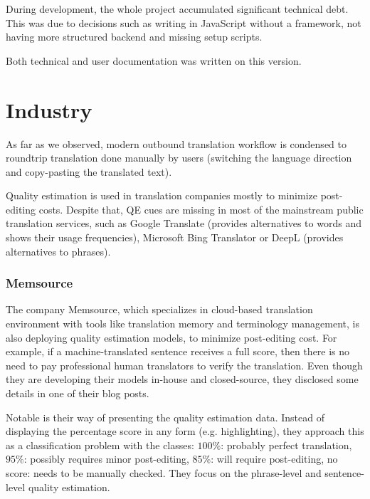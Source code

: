 During development, the whole project accumulated significant technical debt. This was due to decisions such as writing in JavaScript without a framework, not having more structured backend and missing setup scripts.

Both technical and user documentation was written on this version.

\newpage

\section{Industry} \label{sec:related_industry}

As far as we observed, modern outbound translation workflow is condensed to roundtrip translation done manually by users (switching the language direction and copy-pasting the translated text).

Quality estimation is used in translation companies mostly to minimize post-editing costs. Despite that, QE cues are missing in most of the mainstream public translation services, such as Google Translate (provides alternatives to words and shows their usage frequencies), Microsoft Bing Translator or DeepL (provides alternatives to phrases).

\subsubsection{Memsource}

The company Memsource, which specializes in cloud-based translation environment with tools like translation memory and terminology management, is also deploying quality estimation models, to minimize post-editing cost. For example, if a machine-translated sentence receives a full score, then there is no need to pay professional human translators to verify the translation. Even though they are developing their models in-house and closed-source, they disclosed some details in one of their blog posts.

Notable is their way of presenting the quality estimation data. Instead of displaying the percentage score in any form (e.g. highlighting), they approach this as a classification problem with the classes: $100\%$: probably perfect translation, $95\%$: possibly requires minor post-editing, $85\%$: will require post-editing, no score: needs to be manually checked. They focus on the phrase-level and sentence-level quality estimation.

